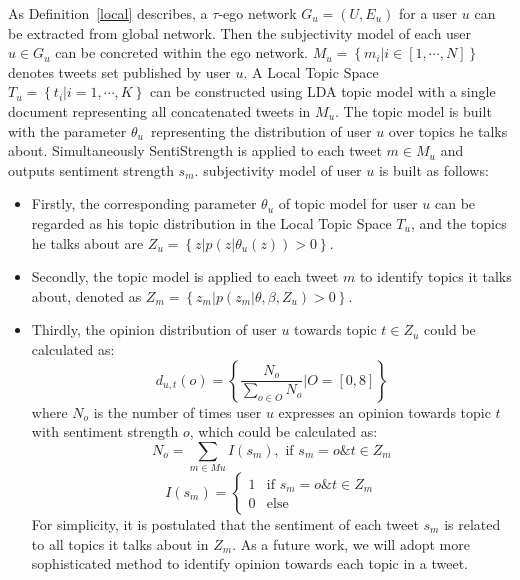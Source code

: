 \documentclass[letterpaper]{article}
\begin{document}
As Definition~\ref{local} describes, a $ \tau $-ego network $ G_{u}=\left( U,E_{u} \right)  $ for a user $ u $ can be extracted from global network. 
Then the subjectivity model of each user $ u \in G_{u} $ can be concreted within the ego network. 
$ M_{u}=\left\lbrace m_{i} \vert i \in \left[ 1, \cdots, N \right]  \right\rbrace$ denotes tweets set published by user $ u $. A Local Topic Space $ T_{u}=\left\lbrace t_{i} \vert i=1, \cdots, K \right\rbrace $ can be constructed using LDA topic model with a single document representing all concatenated tweets in $ M_{u} $.
The topic model is built with the parameter $ \theta_{u} $\ representing the distribution of user $ u $ over topics he talks about. Simultaneously SentiStrength is applied to each tweet $ m \in M_{u} $ and outputs sentiment strength $ s_{m} $. 
subjectivity model of user $ u $ is built as follows:
\begin{itemize}
\item Firstly, the corresponding parameter $ \theta_{u} $ of topic model for user $ u $ can be regarded as his topic distribution in the Local Topic Space $ T_{u} $, and the topics he talks about are $ Z_{u}= \left\lbrace z \vert p\left( z \vert \theta_{u}\left( z \right)  \right)>0 \right\rbrace $.
\item Secondly, the topic model is applied to each tweet $ m $ to identify topics it talks about, denoted as $ Z_{m} =\left\lbrace z_{m} \vert p\left( z_{m} \vert \theta, \beta, Z_{u} \right)>0 \right\rbrace $.
\item Thirdly, the opinion distribution of user $ u $ towards topic $ t \in Z_{u} $ could be calculated as: 
\begin{equation}
\label{opinionall}
d_{u,t}\left( o \right) = \left\lbrace \dfrac{N_{o}}{\sum_{o \in O} N_{o}} \vert O=\left[ 0,8 \right] \right\rbrace 
\end{equation}
where $ N_{o} $ is the number of times user $ u $ expresses an opinion towards topic $ t $ with sentiment strength $ o $, which could be calculated as:
\begin{equation}
\label{opinion1}
N_{o}=\sum_{m \in Mu} I\left( s_{m} \right) , \text{ if } s_{m}=o \& t \in Z_{m}
\end{equation}
\begin{equation}
\label{opinion2}
I\left( s_{m} \right)=\left\{
\begin{array}{ll}
{1} & \text{if } s_{m}=o \& t \in Z_{m}\\
{0} & \text{else}
\end{array}
\right.
\end{equation}
For simplicity, it is postulated that the sentiment of each tweet $ s_{m} $ is related to all topics it talks about in $ Z_{m} $. As a future work, we will adopt more sophisticated method to identify opinion towards each topic in a tweet.
\end{itemize}
\end{document}
